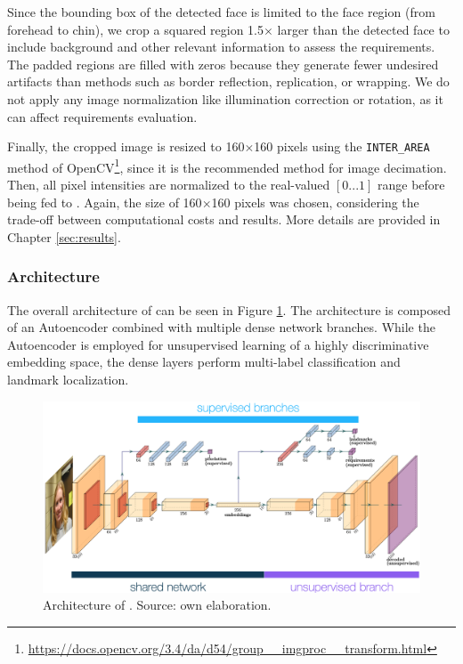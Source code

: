 Since the bounding box of the detected face is limited to the face region (from forehead to chin), we crop a squared region 1.5$\times$ larger than the detected face to include background and other relevant information to assess the requirements. The padded regions are filled with zeros because they generate fewer undesired artifacts than methods such as border reflection, replication, or wrapping. We do not apply any image normalization like illumination correction or rotation, as it can affect requirements evaluation. 
 
Finally, the cropped image is resized to 160$\times$160 pixels using the \texttt{INTER\_AREA} method of OpenCV\footnote{\url{https://docs.opencv.org/3.4/da/d54/group__imgproc__transform.html}}, since it is the recommended method for image decimation. Then, all pixel intensities are normalized to the real-valued $[0...1]$ range before being fed to \methodname. Again, the size of 160$\times$160 pixels was chosen, considering the trade-off between computational costs and results. More details are provided in Chapter \ref{sec:results}. 
 
\subsubsection{Architecture}
 
The overall architecture of \methodname can be seen in Figure \ref{fig:icaonet}. The architecture is composed of an Autoencoder combined with multiple dense network branches. While the Autoencoder is employed for unsupervised learning of a highly discriminative embedding space, the dense layers perform multi-label classification and landmark localization.
 
\begin{figure}[tb]
\centering
\includegraphics[width=\linewidth]{images/icaonet/icaonet.png}
\caption{Architecture of \methodname. Source: own elaboration.}
\label{fig:icaonet}
\end{figure}
 
